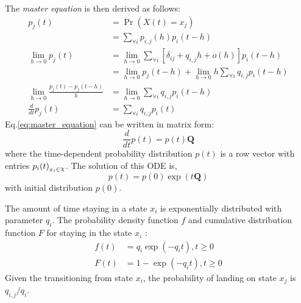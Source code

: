 The \textit{master equation} is then derived as follows:
\begin{align}
	p_{j}(t) &= \operatorname{Pr}(X(t) = x_{j}) \nonumber\\
		& =\sum_{\forall i} p_{i, j}(h) p_{i}(t-h) \nonumber \\
	\lim_{h\rightarrow 0} p_{j}(t) 
		& = \lim_{h\rightarrow 0} \sum_{\forall i} \left[ \delta_{ij}+q_{i,j} h+o(h)\right]  p_{i}(t-h) \nonumber \\ 
		& = \lim_{h\rightarrow 0} p_{j}(t-h) + \lim_{h\rightarrow 0} h \sum_{\forall i} q_{i,j} p_{i}(t-h) \nonumber \\
	\lim_{h\rightarrow 0} \frac{p_{j}(t) - p_{j}(t-h)}{h} 
		&= \lim_{h\rightarrow 0} \sum_{\forall i} q_{i,j} p_{i}(t-h) \nonumber\\
	\frac{d}{dt} p_{j}(t) & = \sum_{\forall i} q_{i,j} p_{i}(t)
	\label{eq:master_equation}
\end{align}
Eq.\ref{eq:master_equation} can be written in matrix form:
\begin{equation}
\frac{d}{dt} p(t) = p(t)\textbf{Q}
\end{equation}
where the time-dependent probability distribution $ p(t) $ is a row vector with entries $ {p_{i}(t)}_{x_{i}\in \rchi} $. 
The solution of this ODE is, 
\begin{equation}
p(t)=p(0) \exp (t\textbf{Q})
\end{equation}
with initial distribution $ p(0) $.

The amount of time staying in a state $ x_{i} $ is exponentially distributed with parameter $ q_{i} $. The probability density function $ f $ and cumulative distribution function $ F $ for staying in the state $ x_{i} $ \cite{Nodelman1995}:
\begin{align}
f(t) & = q_{i} \exp \left(-q_{i} t\right), t\geq 0  \label{eq:f(t)_homo}\\
F(t) & = 1 - \exp \left(-q_{i} t\right), t\geq 0 
\end{align}
Given the transitioning from state $ x_{i} $, the probability of landing on state $ x_{j} $ is $ q_{i,j}/q_{i} $.
